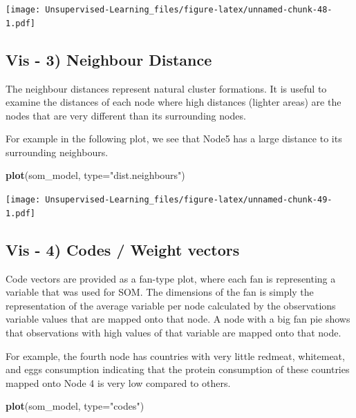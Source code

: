 \documentclass[
]{book}
\newenvironment{Shaded}{\begin{snugshade}}{\end{snugshade}}
\newcommand{\DataTypeTok}[1]{\textcolor[rgb]{0.13,0.29,0.53}{#1}}
\newcommand{\KeywordTok}[1]{\textcolor[rgb]{0.13,0.29,0.53}{\textbf{#1}}}
\newcommand{\NormalTok}[1]{#1}
\newcommand{\StringTok}[1]{\textcolor[rgb]{0.31,0.60,0.02}{#1}}
\begin{document}
\texttt{[image: Unsupervised-Learning\_files/figure-latex/unnamed-chunk-48-1.pdf]}

\hypertarget{vis---3-neighbour-distance}{%
\subsection{Vis - 3) Neighbour Distance}\label{vis---3-neighbour-distance}}

The neighbour distances represent natural cluster formations. It is useful to examine the distances of each node where high distances (lighter areas) are the nodes that are very different than its surrounding nodes.

For example in the following plot, we see that Node5 has a large distance to its surrounding neighbours.

\begin{Shaded}
\begin{Highlighting}[]
\KeywordTok{plot}\NormalTok{(som_model, }\DataTypeTok{type=}\StringTok{"dist.neighbours"}\NormalTok{)}
\end{Highlighting}
\end{Shaded}

\texttt{[image: Unsupervised-Learning\_files/figure-latex/unnamed-chunk-49-1.pdf]}

\hypertarget{vis---4-codes-weight-vectors}{%
\subsection{Vis - 4) Codes / Weight vectors}\label{vis---4-codes-weight-vectors}}

Code vectors are provided as a fan-type plot, where each fan is representing a variable that was used for SOM. The dimensions of the fan is simply the representation of the average variable per node calculated by the observations variable values that are mapped onto that node. A node with a big fan pie shows that observations with high values of that variable are mapped onto that node.

For example, the fourth node has countries with very little redmeat, whitemeat, and eggs consumption indicating that the protein consumption of these countries mapped onto Node 4 is very low compared to others.

\begin{Shaded}
\begin{Highlighting}[]
\KeywordTok{plot}\NormalTok{(som_model, }\DataTypeTok{type=}\StringTok{"codes"}\NormalTok{)}
\end{Highlighting}
\end{Shaded}
\end{document}
